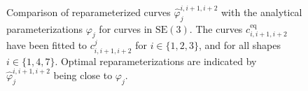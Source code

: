 \begin{figure}
    \caption[Reparameterization of curves in \(\mathrm{SO}(3)^3\)]{Comparison of reparameterized curves \(\hat{\varphi}_j^{i,i+1,i+2}\) with the analytical parameterizations \(\varphi_j\) for curves in \(\mathrm{SE}(3)\). The curves \(c_{i,i+1,i+2}^{\text{eq}}\) have been fitted to \(c_{i,i+1,i+2}^j\) for \(i \in \{1, 2, 3\}\), and for all shapes \(i \in \{1, 4, 7\}\). Optimal reparameterizations are indicated by \(\hat{\varphi}_j^{i,i+1,i+2}\) being close to \(\varphi_j\).}
    \label{fig:reparameterization-SO3-3}
\end{figure}

